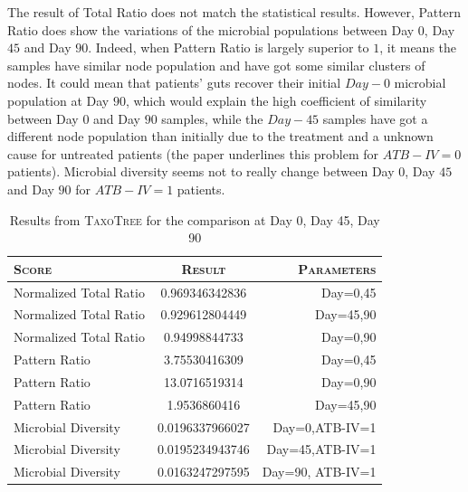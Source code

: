 \documentclass{report}
\begin{document}
The result of Total Ratio does not match the statistical results. However, Pattern Ratio does show the variations of the microbial populations between Day $0$, Day $45$ and Day $90$. Indeed, when Pattern Ratio is largely superior to $1$, it means the samples have similar node population and have got some similar clusters of nodes. It could mean that patients' guts recover their initial $Day-0$ microbial population at Day $90$, which would explain the high coefficient of similarity between Day $0$ and Day $90$ samples, while the $Day-45$ samples have got a different node population than initially due to the treatment and a unknown cause for untreated patients (the paper underlines this problem for $ATB-IV = 0$ patients). Microbial diversity seems not to really change between Day $0$, Day $45$ and Day $90$ for $ATB-IV = 1$ patients.

     \begin{table}
       \caption{Results from \textsc{TaxoTree} for the comparison at Day 0, Day 45, Day 90}
       \begin{tabular}{|l|c|r|}
         \hline
         \textsc{Score} & \textsc{Result} & \textsc{Parameters}\\
         \hline
         Normalized Total Ratio & 0.969346342836 & Day=0,45\\
         \hline
         Normalized Total Ratio & 0.929612804449 & Day=45,90\\
         \hline
         Normalized Total Ratio & 0.94998844733 & Day=0,90\\
         \hline
         Pattern Ratio & 3.75530416309 & Day=0,45 \\
         \hline
         Pattern Ratio & 13.0716519314 & Day=0,90 \\
         \hline
         Pattern Ratio & 1.9536860416 & Day=45,90 \\
         \hline
         Microbial Diversity & 0.0196337966027 & Day=0,ATB-IV=1 \\
         \hline
         Microbial Diversity & 0.0195234943746 & Day=45,ATB-IV=1 \\
         \hline
         Microbial Diversity & 0.0163247297595 & Day=90, ATB-IV=1\\
         \hline
       \end{tabular}
     \end{table}
\end{document}
